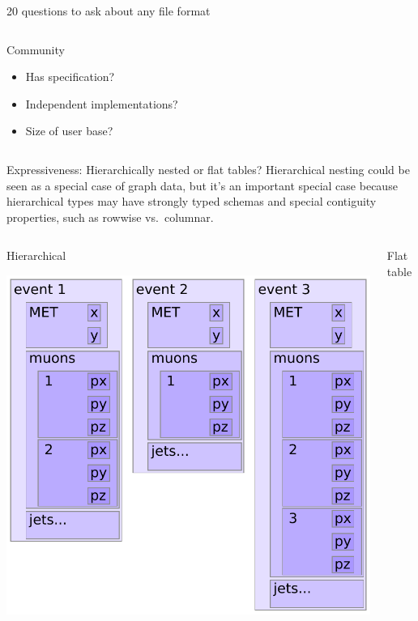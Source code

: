 \documentclass[aspectratio=169]{beamer}
\begin{document}
\begin{frame}{20 questions to ask about any file format}
\begin{columns}
\vspace{-0.2 cm}

\begin{block}{Community}
\vspace{-0.2 cm}
\begin{itemize}\setlength{\itemsep}{-0.05 cm}
\item Has specification?
\item Independent implementations?
\item Size of user base?
\end{itemize}
\end{block}

\end{columns}
\end{frame}

\begin{frame}{Expressiveness: Hierarchically nested or flat tables?}
\vspace{0.5 cm}
Hierarchical nesting could be seen as a special case of graph data, but it's an important special case because hierarchical types may have strongly typed schemas and special contiguity properties, such as rowwise vs.\ columnar.

\vspace{-0.5 cm}

\begin{columns}[t]
\begin{center}
Hierarchical

\vspace{0.2 cm}
\includegraphics[width=0.7\linewidth]{event-structure.pdf}
\end{center}
\begin{center}
Flat table


\end{center}
\end{columns}
\end{frame}
\end{document}
